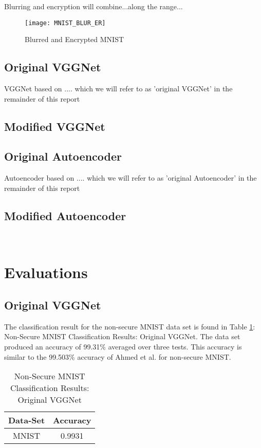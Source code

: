 \documentclass[12pt, titlepage]{article}
\begin{document}
Blurring and encryption will combine...along the range...

\begin{figure}[h!]
	\begin{center}
		\texttt{[image: MNIST\_BLUR\_ER]}
		\caption{Blurred and Encrypted MNIST}
		\label{MNIST_BLURRED_EN}
	\end{center}
\end{figure} 
 
\subsection{Original VGGNet} 

VGGNet based on .... which we will refer to as 'original VGGNet' in the remainder of this report

\subsection{Modified VGGNet} 

\subsection{Original Autoencoder} 

Autoencoder based on .... which we will refer to as 'original Autoencoder' in the remainder of this report

\subsection{Modified Autoencoder} 
 
 ~\newpage
\section{Evaluations}\label{Evaluations}
\subsection{Original VGGNet}\label{EvalOrigVGG}

The classification result for the non-secure MNIST data set is found in Table \ref{table:basicVGG_MNIST}: Non-Secure MNIST Classification Results: Original VGGNet. The data set produced an accuracy of 99.31\% averaged over three tests. This accuracy is similar to the 99.503\% accuracy of Ahmed et al. for non-secure MNIST.\\ 

\begin{table}[!h]
	\begin{center}
		\begin{tabular}{| c | c |}
			\hline
			\textbf{Data-Set} & \textbf{Accuracy}\\
			\hline
			MNIST & 0.9931\\
			\hline
		\end{tabular}
		\caption{Non-Secure MNIST Classification Results: Original VGGNet}
		\label{table:basicVGG_MNIST}
	\end{center}
\end{table}
\end{document}
